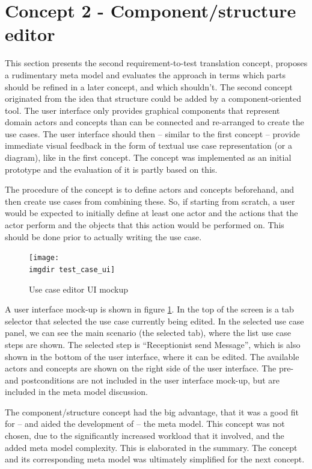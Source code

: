 \section{Concept 2 - Component/structure editor}
This section presents the second requirement-to-test translation concept, proposes a rudimentary meta model and evaluates the approach in terms which parts should be refined in a later concept, and which shouldn't.
The second concept originated from the idea that structure could be added by a component-oriented tool. The user interface only provides graphical components that represent domain actors and concepts than can be connected and re-arranged to create the use cases. The user interface should then -- similar to the first concept -- provide immediate visual feedback in the form of textual use case representation (or a diagram), like in the first concept. The concept was implemented as an initial prototype and the evaluation of it is partly based on this.\medskip

\noindent The procedure of the concept is to define actors and concepts beforehand, and then create use cases from combining these. So, if starting from scratch, a user would be expected to initially define at least one actor and the actions that the actor perform and the objects that this action would be performed on. This should be done prior to actually writing the use case.\medskip
\begin{figure}[!htbp]
\texttt{[image: \\imgdir test\_case\_ui]}
\centering
\caption{Use case editor UI mockup}
\label{fig:use_case_editor_mockup}
\end{figure}

\noindent A user interface mock-up is shown in figure \ref{fig:use_case_editor_mockup}. In the top of the screen is a tab selector that selected the use case currently being edited. In the selected use case panel, we can see the main scenario (the selected tab), where the list use case steps are shown. The selected step is ``Receptionist send Message'', which is also shown in the bottom of the user interface, where it can be edited. The available actors and concepts are shown on the right side of the user interface. The pre- and postconditions are not included in the user interface mock-up, but are included in the meta model discussion.\medskip

\noindent The component/structure concept had the big advantage, that it was a good fit for -- and aided the development of -- the meta model. This concept was not chosen, due to the significantly increased workload that it involved, and the added meta model complexity. This is elaborated in the summary. The concept and its corresponding meta model was ultimately simplified for the next concept.

